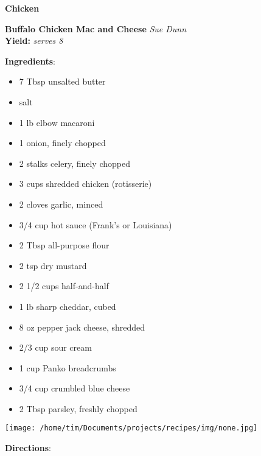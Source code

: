 \documentclass[11pt, twoside, openany]{book}
\begin{document}
{\newpage \LARGE \textbf{Chicken}} \label{chicken}\vspace{4mm}\\
\noindent\begin{minipage}[t]{\linewidth}%
{\Large\textbf{Buffalo Chicken Mac and Cheese}} \label{buffalo-chicken-mac-and-cheese}\hfill\textit{Sue Dunn}\\
\textbf{Yield:} \textit{serves 8}\\
\noindent\begin{minipage}[t]{0.78\linewidth}%
\textbf{Ingredients}:\vspace{-3mm}
\begin{multicols}{2}
\begin{itemize}\setlength\itemsep{-1mm}
\item 7 Tbsp unsalted butter
\item salt
\item 1 lb elbow macaroni
\item 1 onion, finely chopped
\item 2 stalks celery, finely chopped
\item 3 cups shredded chicken (rotisserie)
\item 2 cloves garlic, minced
\item 3/4 cup hot sauce (Frank's or Louisiana)
\item 2 Tbsp all-purpose flour
\item 2 tsp dry mustard
\item 2 1/2 cups half-and-half
\item 1 lb sharp cheddar, cubed
\item 8 oz pepper jack cheese, shredded
\item 2/3 cup sour cream
\item 1 cup Panko breadcrumbs
\item 3/4 cup crumbled blue cheese
\item 2 Tbsp parsley, freshly chopped
\end{itemize}
\end{multicols}
\end{minipage}
\noindent\begin{minipage}[t]{0.18\linewidth}
\centering \strut\vspace*{-\baselineskip}\newline
\texttt{[image: /home/tim/Documents/projects/recipes/img/none.jpg]}\\
\end{minipage}\vspace{3mm}
\textbf{Directions}:

\end{minipage}
\end{document}
